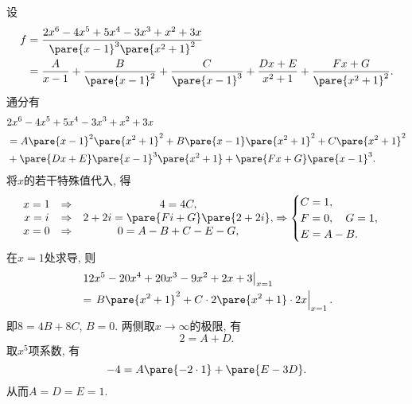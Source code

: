 \documentclass{ctexart}
\begin{document}
\begin{sample}
    \begin{ex}
        设
        \begin{align*}
            f &= \frac{2x^6 - 4x^5 + 5x^4 - 3x^3 + x^2 + 3x}{\pare{x-1}^3\pare{x^2+1}^2} \\ &= \frac{A}{x-1} + \frac{B}{\pare{x-1}^2} + \frac{C}{\pare{x-1}^3} + \frac{Dx+E}{x^2+1} + \frac{Fx+G}{\pare{x^2+1}^2}. 
        \end{align*}
        通分有
        \begin{align*}
            & 2x^6 - 4x^5 + 5x^4 - 3x^3 + x^2 + 3x \\
            &= A\pare{x-1}^2 \pare{x^2+1}^2 + B\pare{x-1}\pare{x^2+1}^2 + C\pare{x^2+1}^2 \\
            &+\pare{Dx+E}\pare{x-1}^3\pare{x^2+1} + \pare{Fx+G}\pare{x-1}^3.
        \end{align*}
        将$x$的若干特殊值代入, 得
        \[ \begin{matrix}
            x=1 & \Rightarrow & 4=4C, \\
            x=i & \Rightarrow & 2+2i = \pare{Fi+G}\pare{2+2i}, \\
            x=0 & \Rightarrow & 0 = A-B+C-E-G,
        \end{matrix} \Rightarrow \begin{cases}
            C = 1, \\
            F = 0,\quad G = 1,\\
            E = A-B.
        \end{cases} \]
        在$x=1$处求导, 则
        \begin{align*}
            & \left. 12x^5 - 20x^4 + 20x^3 - 9x^2 + 2x + 3\right\vert_{x=1} \\ &= \left. B\pare{x^2+1}^2 + C\cdot 2\pare{x^2+1}\cdot 2x\right\vert_{x=1}.
        \end{align*}
        即$8 = 4B + 8C$, $B = 0$. 两侧取$x\rightarrow\infty$的极限, 有
        \[ 2 = A + D. \]
        取$x^5$项系数, 有
        \[ -4 = A\pare{-2\cdot 1} + \pare{E - 3D}. \]
        从而$A = D = E = 1$.
    \end{ex}
\end{sample}
\end{document}
